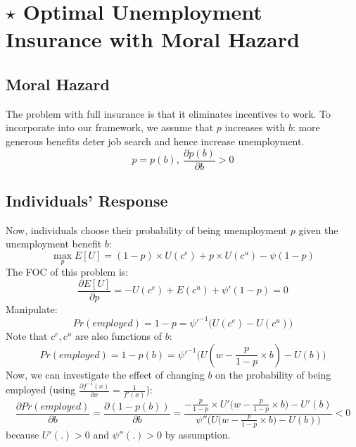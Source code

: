 \section{$\star$ Optimal Unemployment Insurance with Moral Hazard}

    \subsection{Moral Hazard}
        The problem with full insurance is that it eliminates incentives to work. To incorporate  into our framework, we assume that $p$ increases with $b$: more generous benefits deter job search and hence increase unemployment.
        $$p=p(b),\ \frac{\partial p(b)}{\partial b}>0$$
        
    \subsection{Individuals' Response}
        Now, individuals choose their probability of being unemployment $p$ given the unemployment benefit $b$:
        $$\max_p E[U] = (1-p)\times{U(c^e)} + p\times{U(c^u)} - \psi(1-p)$$
        The FOC of this problem is:
        $$\frac{\partial E[U]}{\partial p}=-U(c^e)+E(c^u)+\psi'(1-p) = 0$$
        Manipulate:
        $$Pr(employed) = 1-p = \psi'^{-1}\Big(U(c^e)-U(c^u)\Big)$$
        Note that $c^e, c^u$ are also functions of $b$:
        \begin{equation}
            \label{eqn:ui_mh_optimal_p}
            Pr(employed) = 1-p(b) = \psi'^{-1}\Big(U(w-\frac{p}{1-p}\times{b})-U(b)\Big)
        \end{equation}
        Now, we can investigate the effect of changing $b$ on the probability of being employed (using $\frac{\partial f^{-1}(x)}{\partial x} = \frac{1}{f'(x)}$):
        $$\frac{\partial Pr(employed)}{\partial b}=\frac{\partial(1-p(b))}{\partial b} = \frac{-\frac{p}{1-p}\times{U'\big(w-\frac{p}{1-p}\times{b}\big)}-U'(b)}{\psi''\Big(U\big(w-\frac{p}{1-p}\times{b}\big)-U(b)\Big)} < 0$$
        because $U'(.)>0$ and $\psi''(.)>0$ by assumption.
        
